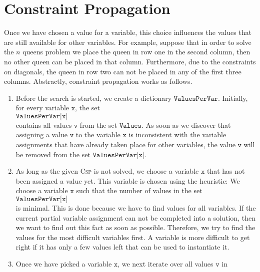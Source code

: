 \section{Constraint Propagation}
Once we have chosen a value for a variable, this choice influences the values that are still available for
other variables. 
For example, suppose that in order to solve the $n$ queens problem we place the queen in row one in the second
column, then no other queen can be placed in 
that column.   Furthermore, due to the constraints on diagonals, the queen in row two can not be placed
in any of the first three columns.  Abstractly, constraint propagation works as follows.
\begin{enumerate}
\item Before the search is started, we create a dictionary $\texttt{ValuesPerVar}$.  Initially, for every variable
      $\texttt{x}$,  the set
      \\[0.2cm]
      \hspace*{1.3cm}
      $\texttt{ValuesPerVar[x]}$ 
      \\[0.2cm]
      contains all values $\texttt{v}$ from the set $\texttt{Values}$.  As soon as we discover that assigning a
      value $\texttt{v}$ to the variable $\texttt{x}$ is inconsistent with the variable
      assignments that have already taken place for other variables, the value $\texttt{v}$ will be removed from the set
      $\texttt{ValuesPerVar[x]}$. 
\item As long as the given \textsc{Csp} is not solved,  we choose a variable $\texttt{x}$ that has not been assigned a
      value yet.  This variable is chosen using the 
       heuristic:  We choose a
      variable $\texttt{x}$ such that the number of values in the set
      \\[0.2cm]
      \hspace*{1.3cm}
      $\texttt{ValuesPerVar[x]}$ 
      \\[0.2cm]
      is minimal.  This is done because we have to
      find values for all variables.  If the current partial variable assignment can not be completed into a
      solution, then we want to find out this fact as soon as possible.  Therefore, we try to find the values
      for the most difficult variables first.  A variable is more difficult to get right if it has only a few
      values left that can be used to instantiate it.
\item Once we have picked a variable $\texttt{x}$, we next iterate over all values $\texttt{v}$ in

\end{enumerate}
